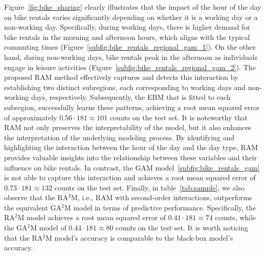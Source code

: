 \documentclass[runningheads]{llncs}
\begin{document}
Figure~\ref{fig:bike_sharing} clearly illustrates that the impact of the hour of the day on bike rentals varies
significantly depending on whether it is a working day or a non-working day.
Specifically, during working days, there is higher demand for bike rentals in the morning and afternoon hours,
which aligns with the typical commuting times (Figure~\ref{subfig:bike_rentals_regional_gam_1}).
On the other hand, during non-working days, bike rentals peak in the afternoon as individuals engage in
leisure activities (Figure~\ref{subfig:bike_rentals_regional_gam_2}).
The proposed RAM method effectively captures and detects this interaction by establishing two distinct subregions,
each corresponding to working days and non-working days, respectively.
Subsequently, the EBM that is fitted to each subregion, successfully learns these patterns,
achieving a root mean squared error of approximately \( 0.56 \cdot 181 \approx 101\) counts on the test set.
It is noteworthy that RAM not only preserves the interpretability of the model,
but it also enhances the interpretation of the underlying modeling process.
By identifying and highlighting the interaction between the hour of the day and the day type,
RAM provides valuable insights into the relationship between these variables and their influence on bike rentals.
In contrast, the GAM model~\ref{subfig:bike_rentals_gam} is not able to capture this interaction and
achieves a root mean squared error of \( 0.73 \cdot 181 \approx 132\) counts on the test set.
Finally, in table~\ref{tab:sample}, we also observe that the RA$^2$M, i.e., RAM with second-order interactions,
outperforms the equivalent GA$^2$M model in terms of predictive performance.
Specifically, the RA$^2$M model achieves a root mean squared error of \( 0.41 \cdot 181 \approx 74\) counts,
while the GA$^2$M model of \( 0.44 \cdot 181 \approx 80\) counts on the test set.
It is worth noticing that the RA$^2$M model's accuracy is comparable to the black-box model's accuracy.
\end{document}
